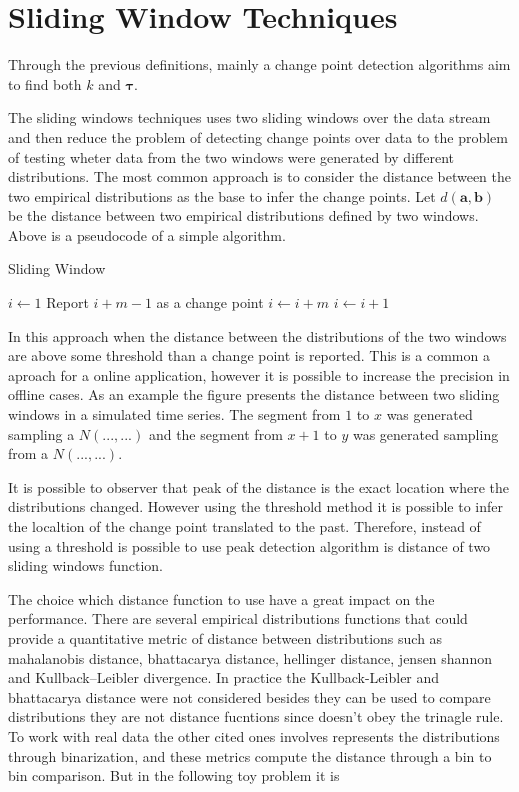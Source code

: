 \section{Sliding Window Techniques}

Through the previous definitions, mainly a change point detection algorithms aim to find both $k$ and $\boldsymbol \tau$.

The sliding windows techniques uses two sliding windows over the data stream and then reduce the problem of detecting change points over data to the problem of testing wheter data from the two windows were generated by different distributions. The most common approach is to consider the distance between the two empirical distributions as the base to infer the change points. Let $d(\mathbf{a}, \mathbf{b})$ be the distance between two empirical distributions defined by two windows. Above is a pseudocode of a simple algorithm.

\begin{algorithm}[H]
\caption{Sliding Window}
	\begin{algorithmic}[1]
		\State $i \gets 1$
                \State Report $i + m - 1$ as a change point
		        \State $i \gets i + m$
             \Else
		        \State $i \gets i + 1$
             \EndIf
        \EndWhile
	\end{algorithmic}
\end{algorithm}

In this approach when the distance between the distributions of the two windows are above some threshold than a change point is reported. This is a common a aproach for a online application, however it is possible to increase the precision in offline cases. As an example the figure presents the distance between two sliding windows in a simulated time series. The segment from $1$ to $x$ was generated sampling a $N(..., ...)$ and the segment from $x+1$ to $y$ was generated sampling from a $N(..., ...)$.

It is possible to observer that peak of the distance is the exact location where the distributions changed. However using the threshold method it is possible to infer the localtion of the change point translated to the past. Therefore, instead of using a threshold is possible to use peak detection algorithm is distance of two sliding windows function.

The choice which distance function to use have a great impact on the performance. There are several empirical distributions functions that could provide a quantitative metric of distance between distributions such as mahalanobis distance, bhattacarya distance, hellinger distance, jensen shannon and Kullback–Leibler divergence. In practice the Kullback-Leibler and bhattacarya distance were not considered besides they can be used to compare distributions they are not distance fucntions since doesn't obey the trinagle rule. To work with real data the other cited ones involves represents the distributions through binarization, and these metrics compute the distance through a bin to bin comparison. But in the following toy problem it is  

